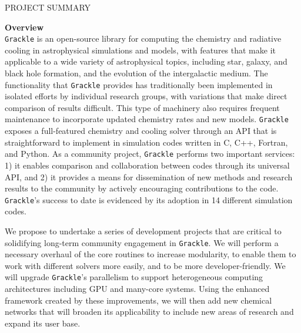 \documentclass[11pt]{article}
\newcommand{\grackle}{\texttt{Grackle}}
\begin{document}
\thispagestyle{empty}

\clearpage

\clearpage
\begin{center} 
{\large PROJECT SUMMARY}\\
\end{center}

\begin{flushleft}
\noindent
{\bf \large Overview}\\
\grackle{} is an open-source library for computing the chemistry and
radiative cooling in astrophysical simulations and models, with
features that make it applicable to a wide variety of astrophysical
topics, including star, galaxy, and black hole formation, and the
evolution of the intergalactic medium.
The functionality that \grackle{} provides has traditionally
been implemented in isolated efforts by individual research groups,
with variations that make direct comparison of results difficult.
This type of machinery also requires frequent maintenance to
incorporate updated chemistry rates and new models.
\grackle{} exposes a full-featured chemistry and cooling solver
through an API that is straightforward to implement in simulation
codes written in C, C++, Fortran, and Python.
As a community project, \grackle{} performs two important services: 1)
it enables comparison and collaboration between codes through its universal API,
and 2) it provides a means for dissemination of new methods and
research results to the community by actively encouraging
contributions to the code.  \grackle{}'s success to date is evidenced by its
adoption in 14 different simulation codes.

We propose to undertake a series of development projects that are
critical to solidifying long-term community engagement in \grackle{}.
We will perform a necessary overhaul of the core routines to increase
modularity, to enable them to work with different solvers more easily,
and to be more developer-friendly.  We will upgrade \grackle{}'s
parallelism to support heterogeneous computing architectures including
GPU and many-core systems.  Using the enhanced framework created by
these improvements, we will then add new chemical networks that will
broaden its applicability to include new areas of research and expand
its user base.


\end{flushleft}
\end{document}
